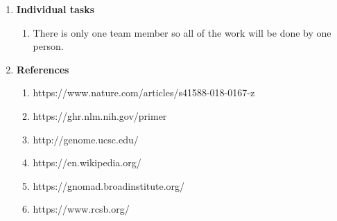 \documentclass[twoside]{article}
\begin{document}
\begin{enumerate}
\item \textbf{Individual tasks}
     \begin{enumerate}
     \item There is only one team member so all of the work will be done by one person.
     \end{enumerate}

\item \textbf{References}
     \begin{enumerate}
     \item https://www.nature.com/articles/s41588-018-0167-z
     \item https://ghr.nlm.nih.gov/primer
     \item http://genome.ucsc.edu/
     \item https://en.wikipedia.org/
     \item https://gnomad.broadinstitute.org/
     \item https://www.rcsb.org/
     \end{enumerate}
\end{enumerate}
\newpage
\end{document}
